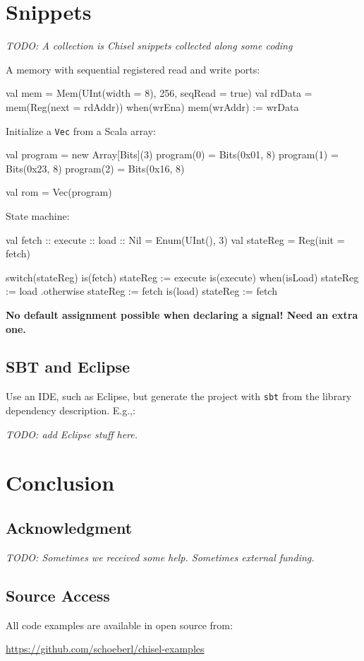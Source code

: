 \documentclass[a4paper]{article}
\newcommand{\code}[1]{{\small{\texttt{#1}}}}
\newcommand{\todo}[1]{{\emph{TODO: #1}}}
\begin{document}
\section{Snippets}

\todo{A collection is Chisel snippets collected along some coding}


A memory with sequential registered read and write ports:
\begin{chisel}
  val mem = Mem(UInt(width = 8), 256, seqRead = true)
  val rdData = mem(Reg(next = rdAddr))
  when(wrEna) {
    mem(wrAddr) := wrData
  }
\end{chisel}

Initialize a \code{Vec} from a Scala array:
\begin{chisel}
  val program = new Array[Bits](3)
  program(0) = Bits(0x01, 8)
  program(1) = Bits(0x23, 8)
  program(2) = Bits(0x16, 8)
    
  val rom = Vec(program)
\end{chisel}

State machine:
\begin{chisel}
  val fetch :: execute :: load :: Nil = Enum(UInt(), 3)
  val stateReg = Reg(init = fetch)

  switch(stateReg) {
    is(fetch) {
      stateReg := execute
    }
    is(execute) {
      when(isLoad) {
        stateReg := load
      }.otherwise {
        stateReg := fetch
      }
    }
    is(load) {
      stateReg := fetch
    }
  }
\end{chisel}

\textbf{No default assignment possible when declaring a signal! Need an extra one.}

\subsection{SBT and Eclipse}

Use an IDE, such as Eclipse, but generate the project with \code{sbt}
from the library dependency description. E.g.,:

\todo{add Eclipse stuff here.}

\section{Conclusion}
\label{sec:conclusion}


\subsection*{Acknowledgment}

\todo{Sometimes we received some help. Sometimes external funding.}



\subsection*{Source Access}

All code examples are available in open source from:

\url{https://github.com/schoeberl/chisel-examples}



\end{document}
